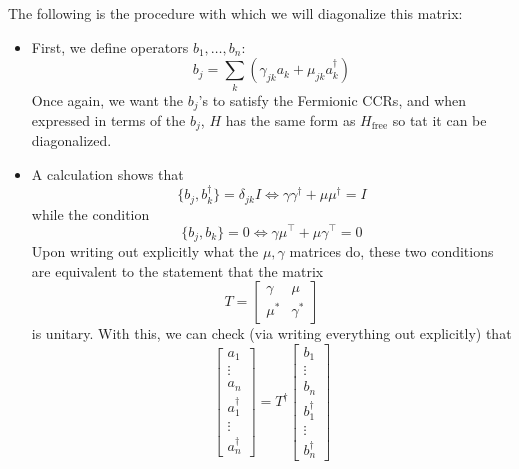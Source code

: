 \documentclass{book}
\theoremstyle{definition}
\newcommand{\lp}{\left(}
\newcommand{\rp}{\right)}
\begin{document}
The following is the procedure with which we will diagonalize this matrix:
\begin{itemize}
	\item First, we define operators $b_1,\dots, b_n$:
	\begin{equation}
	\boxed{b_j = \sum_k \lp \gamma_{jk} a_k + \mu_{jk}a_k^\dagger \rp}
	\end{equation}
	Once again, we want the $b_j$'s to satisfy the Fermionic CCRs, and when expressed in terms of the $b_j$, $H$ has the same form as $H_\text{free}$ so tat it can be diagonalized. \\
	
	\item A calculation shows that 
	\begin{equation}
	\boxed{\{ b_j, b_k^\dagger \} = \delta_{jk} I \iff \gamma\gamma^\dagger + \mu\mu^\dagger = I}
	\end{equation}
	while the condition
	\begin{equation}
	\boxed{\{ b_j ,b_k \} = 0 \iff \gamma \mu^\top + \mu \gamma^\top = 0}
	\end{equation}
	Upon writing out explicitly what the $\mu,\gamma$ matrices do, these two conditions are equivalent to the statement that the matrix 
	\begin{equation}
	\boxed{T = \begin{bmatrix}
	\gamma & \mu \\ \mu^* & \gamma^*
	\end{bmatrix}}
	\end{equation}
	is unitary. With this, we can check (via writing everything out explicitly) that
	\begin{equation}\label{Tdagger}
	\begin{bmatrix}
	a_1 \\ \vdots \\ a_n \\ a_1^\dagger \\ \vdots \\ a_n^\dagger
	\end{bmatrix}
	= T^\dagger 
	\begin{bmatrix}
	b_1 \\ \vdots \\ b_n \\ b_1^\dagger \\ \vdots \\ b_n^\dagger
	\end{bmatrix}
	\end{equation}
	

\end{itemize}
\end{document}
